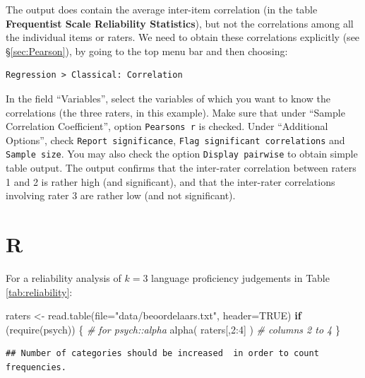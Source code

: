 \documentclass[
]{book}
\newenvironment{Shaded}{\begin{snugshade}}{\end{snugshade}}
\newcommand{\AttributeTok}[1]{\textcolor[rgb]{0.77,0.63,0.00}{#1}}
\newcommand{\CommentTok}[1]{\textcolor[rgb]{0.56,0.35,0.01}{\textit{#1}}}
\newcommand{\ConstantTok}[1]{\textcolor[rgb]{0.00,0.00,0.00}{#1}}
\newcommand{\ControlFlowTok}[1]{\textcolor[rgb]{0.13,0.29,0.53}{\textbf{#1}}}
\newcommand{\DecValTok}[1]{\textcolor[rgb]{0.00,0.00,0.81}{#1}}
\newcommand{\FunctionTok}[1]{\textcolor[rgb]{0.00,0.00,0.00}{#1}}
\newcommand{\NormalTok}[1]{#1}
\newcommand{\OtherTok}[1]{\textcolor[rgb]{0.56,0.35,0.01}{#1}}
\newcommand{\SpecialCharTok}[1]{\textcolor[rgb]{0.00,0.00,0.00}{#1}}
\newcommand{\StringTok}[1]{\textcolor[rgb]{0.31,0.60,0.02}{#1}}
\begin{document}
The output does contain the average inter-item correlation (in the table \textbf{Frequentist Scale Reliability Statistics}), but not the correlations among all the individual items or raters.
We need to obtain these correlations explicitly (see §\ref{sec:Pearson}), by going to the top menu bar and then choosing:

\begin{verbatim}
Regression > Classical: Correlation
\end{verbatim}

In the field ``Variables'', select the variables of which you want to know the correlations (the three raters, in this example).
Make sure that under ``Sample Correlation Coefficient'', option \texttt{Pearson\textquotesingle{}s\ r} is checked.
Under ``Additional Options'', check \texttt{Report\ significance}, \texttt{Flag\ significant\ correlations} and \texttt{Sample\ size}. You may also check the option \texttt{Display\ pairwise} to obtain simple table output. The output confirms that the inter-rater correlation between raters 1 and 2 is rather high (and significant), and that the inter-rater correlations involving rater 3 are rather low (and not significant).

\hypertarget{r-11}{%
\section{R}\label{r-11}}

For a reliability analysis of \(k=3\) language proficiency
judgements in Table \ref{tab:reliability}:\\

\begin{Shaded}
\begin{Highlighting}[]
\NormalTok{raters }\OtherTok{\textless{}{-}} \FunctionTok{read.table}\NormalTok{(}\AttributeTok{file=}\StringTok{"data/beoordelaars.txt"}\NormalTok{, }\AttributeTok{header=}\ConstantTok{TRUE}\NormalTok{)}
\ControlFlowTok{if}\NormalTok{ (}\FunctionTok{require}\NormalTok{(psych)) \{ }\CommentTok{\# for psych::alpha}
  \FunctionTok{alpha}\NormalTok{( raters[,}\DecValTok{2}\SpecialCharTok{:}\DecValTok{4}\NormalTok{] ) }\CommentTok{\# columns 2 to 4}
\NormalTok{\}}
\end{Highlighting}
\end{Shaded}

\begin{verbatim}
## Number of categories should be increased  in order to count frequencies.
\end{verbatim}
\end{document}
